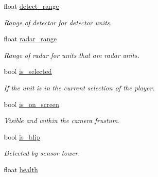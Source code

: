 \begin{DoxyCompactItemize}
\mbox{\label{classsc2_1_1_unit_a212a848d56f8ce323c1a8b5ac7bd0221}} 
float \hyperlink{classsc2_1_1_unit_a212a848d56f8ce323c1a8b5ac7bd0221}{detect\+\_\+range}
\begin{DoxyCompactList}\small\item\em Range of detector for detector units. \end{DoxyCompactList}\item 
\mbox{\label{classsc2_1_1_unit_a22e99532761f81474b7e666e08bf8727}} 
float \hyperlink{classsc2_1_1_unit_a22e99532761f81474b7e666e08bf8727}{radar\+\_\+range}
\begin{DoxyCompactList}\small\item\em Range of radar for units that are radar units. \end{DoxyCompactList}\item 
\mbox{\label{classsc2_1_1_unit_afc532e894e9496c843ac00abce343f41}} 
bool \hyperlink{classsc2_1_1_unit_afc532e894e9496c843ac00abce343f41}{is\+\_\+selected}
\begin{DoxyCompactList}\small\item\em If the unit is in the current selection of the player. \end{DoxyCompactList}\item 
\mbox{\label{classsc2_1_1_unit_a2766e02109100817ffd5135591746293}} 
bool \hyperlink{classsc2_1_1_unit_a2766e02109100817ffd5135591746293}{is\+\_\+on\+\_\+screen}
\begin{DoxyCompactList}\small\item\em Visible and within the camera frustum. \end{DoxyCompactList}\item 
\mbox{\label{classsc2_1_1_unit_aa730ea2bf474d4422e6c6a1e267945d4}} 
bool \hyperlink{classsc2_1_1_unit_aa730ea2bf474d4422e6c6a1e267945d4}{is\+\_\+blip}
\begin{DoxyCompactList}\small\item\em Detected by sensor tower. \end{DoxyCompactList}\item 
\mbox{\label{classsc2_1_1_unit_a7049529d7ec06419b85121a384949abf}} 
float \hyperlink{classsc2_1_1_unit_a7049529d7ec06419b85121a384949abf}{health}

\end{DoxyCompactItemize}
